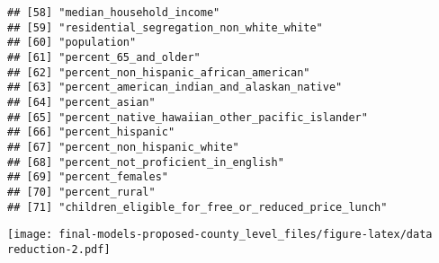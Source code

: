 \documentclass[
]{article}
\newenvironment{Shaded}{\begin{snugshade}}{\end{snugshade}}
\newcommand{\DataTypeTok}[1]{\textcolor[rgb]{0.13,0.29,0.53}{#1}}
\newcommand{\KeywordTok}[1]{\textcolor[rgb]{0.13,0.29,0.53}{\textbf{#1}}}
\newcommand{\NormalTok}[1]{#1}
\newcommand{\OperatorTok}[1]{\textcolor[rgb]{0.81,0.36,0.00}{\textbf{#1}}}
\newcommand{\StringTok}[1]{\textcolor[rgb]{0.31,0.60,0.02}{#1}}
\begin{document}
\begin{verbatim}
## [58] "median_household_income"                                            
## [59] "residential_segregation_non_white_white"                            
## [60] "population"                                                         
## [61] "percent_65_and_older"                                               
## [62] "percent_non_hispanic_african_american"                              
## [63] "percent_american_indian_and_alaskan_native"                         
## [64] "percent_asian"                                                      
## [65] "percent_native_hawaiian_other_pacific_islander"                     
## [66] "percent_hispanic"                                                   
## [67] "percent_non_hispanic_white"                                         
## [68] "percent_not_proficient_in_english"                                  
## [69] "percent_females"                                                    
## [70] "percent_rural"                                                      
## [71] "children_eligible_for_free_or_reduced_price_lunch"
\end{verbatim}

\begin{Shaded}
\end{Shaded}

\texttt{[image: final-models-proposed-county\_level\_files/figure-latex/data reduction-2.pdf]}
\end{document}
